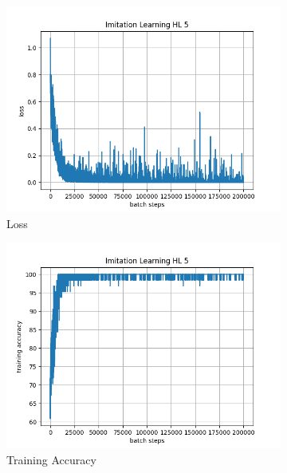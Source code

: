 \documentclass[10pt]{scrartcl}
\begin{document}
\begin{figure}[h]
    \begin{subfigure}{0.5\textwidth}
      \centering
      \includegraphics[width=\linewidth]{images/Il_hl5_loss.png}
      \caption{Loss}
      \label{fig:Il_hl5_loss}
    \end{subfigure} 
    \begin{subfigure}{0.5\textwidth}
      \centering
      \includegraphics[width=\linewidth]{images/Il_hl5_train.png}
      \caption{Training Accuracy}
      \label{fig:Il_hl5_train}
    \end{subfigure} \\
    \begin{subfigure}{0.5\textwidth}
      \centering

\end{subfigure}
\end{figure}
\end{document}
